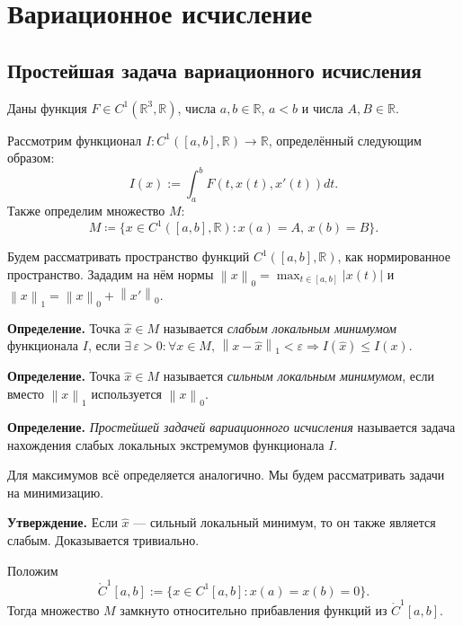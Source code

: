 \newcommand{\norm}[1]{\left\| #1 \right\|}

\section{Вариационное исчисление}
\subsection{Простейшая задача вариационного исчисления}
Даны функция $F  \in C^1(\mathbb R^3, \mathbb R)$, числа $a, b \in \mathbb{R}$, $a < b$ и числа $A, B \in \mathbb{R}$.

Рассмотрим функционал $I\colon C^1([a, b], \mathbb{R}) \to \mathbb{R}$, определённый следующим образом:
$$
    I(x) := \int_a^b F(t, x(t), x'(t)) dt.
$$
Также определим множество $M$:
$$
    M \coloneq \{x \in C^1([a, b], \mathbb{R}) : x(a) = A, \,x(b) = B\}.
$$

Будем рассматривать пространство функций $C^1([a, b], \mathbb{R})$, как нормированное пространство.
Зададим на нём нормы $\norm{x}_0 = \max_{t \in [a, b]} |x(t)|$ и $\norm{x}_1 = \norm{x}_0 + \norm{x'}_0$.

\textbf{Определение.} Точка $\widehat x \in M$ называется \textit{слабым локальным минимумом} функционала $I$, если $\exists \,\varepsilon > 0: \forall x \in M, \,\norm{x -\widehat x}_1 < \varepsilon \Rightarrow I(\widehat x) \le I(x)$.

\textbf{Определение.} Точка $\widehat x \in M$ называется \textit{сильным локальным минимумом}, если вместо $\norm{x}_1$ используется $\norm{x}_0$.

\textbf{Определение.} \textit{Простейшей задачей вариационного исчисления} называется задача нахождения слабых локальных экстремумов функционала $I$.

Для максимумов всё определяется аналогично. Мы будем рассматривать задачи на минимизацию.

\textbf{Утверждение.} Если $\widehat x$ --- сильный локальный минимум, то он также является слабым. Доказывается тривиально.

Положим
\[
    \mathring C^1[a, b] := \{x \in C^1[a, b]: x(a) = x(b) = 0\}.
\]
Тогда множество $M$ замкнуто относительно прибавления функций из $\mathring C^1[a, b]$.


